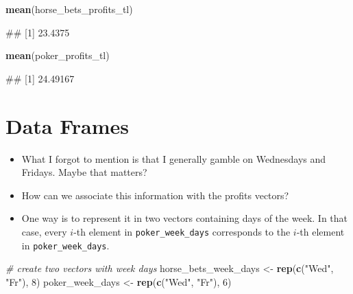 \documentclass[
]{book}
\newenvironment{Shaded}{\begin{snugshade}}{\end{snugshade}}
\newcommand{\CommentTok}[1]{\textcolor[rgb]{0.56,0.35,0.01}{\textit{#1}}}
\newcommand{\DecValTok}[1]{\textcolor[rgb]{0.00,0.00,0.81}{#1}}
\newcommand{\FunctionTok}[1]{\textcolor[rgb]{0.13,0.29,0.53}{\textbf{#1}}}
\newcommand{\NormalTok}[1]{#1}
\newcommand{\OtherTok}[1]{\textcolor[rgb]{0.56,0.35,0.01}{#1}}
\newcommand{\StringTok}[1]{\textcolor[rgb]{0.31,0.60,0.02}{#1}}
\providecommand{\tightlist}{%
  \setlength{\itemsep}{0pt}\setlength{\parskip}{0pt}}
\begin{document}
\begin{Shaded}
\begin{Highlighting}[]
\FunctionTok{mean}\NormalTok{(horse\_bets\_profits\_tl)}
\end{Highlighting}
\end{Shaded}

\begin{Shaded}
\begin{Highlighting}[]
\NormalTok{\#\# [1] 23.4375}
\end{Highlighting}
\end{Shaded}

\begin{Shaded}
\begin{Highlighting}[]
\FunctionTok{mean}\NormalTok{(poker\_profits\_tl)}
\end{Highlighting}
\end{Shaded}

\begin{Shaded}
\begin{Highlighting}[]
\NormalTok{\#\# [1] 24.49167}
\end{Highlighting}
\end{Shaded}

\hypertarget{data-frames}{%
\section{Data Frames}\label{data-frames}}

\begin{itemize}
\tightlist
\item
  What I forgot to mention is that I generally gamble on Wednesdays and Fridays. Maybe that matters?
\item
  How can we associate this information with the profits vectors?
\end{itemize}

\begin{itemize}
\tightlist
\item
  One way is to represent it in two vectors containing days of the week. In that case, every \(i\)-th element in \texttt{poker\_week\_days} corresponds to the \(i\)-th element in \texttt{poker\_week\_days}.
\end{itemize}

\begin{Shaded}
\begin{Highlighting}[]
\CommentTok{\# create two vectors with week days}
\NormalTok{horse\_bets\_week\_days }\OtherTok{\textless{}{-}} \FunctionTok{rep}\NormalTok{(}\FunctionTok{c}\NormalTok{(}\StringTok{"Wed"}\NormalTok{, }\StringTok{"Fr"}\NormalTok{), }\DecValTok{8}\NormalTok{)}
\NormalTok{poker\_week\_days }\OtherTok{\textless{}{-}} \FunctionTok{rep}\NormalTok{(}\FunctionTok{c}\NormalTok{(}\StringTok{"Wed"}\NormalTok{, }\StringTok{"Fr"}\NormalTok{), }\DecValTok{6}\NormalTok{)}
\end{Highlighting}
\end{Shaded}
\end{document}
